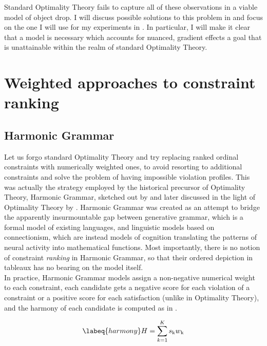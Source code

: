 Standard Optimality Theory fails to capture all of these observations in a viable model of object drop. I will discuss possible solutions to this problem in  and focus on the one I will use for my experiments in . In particular, I will make it clear that a model is necessary which accounts for nuanced, gradient effects \textemdash a goal that is unattainable within the realm of standard Optimality Theory.

\section{Weighted approaches to constraint ranking} 

\subsection{Harmonic Grammar}  %
Let us forgo standard Optimality Theory and try replacing ranked ordinal constraints with numerically weighted ones, to avoid resorting to additional constraints and solve the problem of having impossible violation profiles. 
This was actually the strategy employed by the historical precursor of Optimality Theory, Harmonic Grammar, sketched out by \textcite{smolensky1993integrating, legendre1990can, legendre1991unifying} and later discussed in the light of Optimality Theory by \textcite{legendre2006optimality, pater2009weighted}. Harmonic Grammar was created as an attempt to bridge the apparently insurmountable gap between generative grammar, which is a formal model of existing languages, and linguistic models based on connectionism, which are instead models of cognition translating the patterns of neural activity into mathematical functions. Most importantly, there is no notion of constraint \textit{ranking} in Harmonic Grammar, so that their ordered depiction in tableaux has no bearing on the model itself.\\
In practice, Harmonic Grammar models assign a non-negative numerical weight to each constraint, each candidate gets a negative score for each violation of a constraint or a positive score for each satisfaction (unlike in Optimality Theory), and the harmony of each candidate is computed as in . 

\begin{equation} \labeq{harmony} %
H = \sum_{k=1}^{K} s\textsubscript{k} w\textsubscript{k}
\end{equation}

